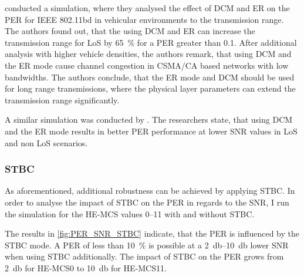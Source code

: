 \textcite{jacob_system-level_2020} conducted a simulation, where they analysed the effect of \ac{DCM} and \ac{ER} on the \ac{PER} for
IEEE 802.11bd in vehicular environments to the transmission range. The authors found out, that the using \ac{DCM} and \ac{ER} can
increase the transmission range for \ac{LoS} by \SI{65}{\percent} for a \ac{PER} greater than \num{0.1}. After additional analysis with higher
vehicle densities, the authors remark, that using \ac{DCM} and the \ac{ER} mode cause channel congestion in CSMA/CA based
networks with low bandwidths. The authors conclude, that the \ac{ER} mode and \ac{DCM} should be used for long range transmissions, where
the physical layer parameters can extend the transmission range significantly.

A similar simulation was conducted by \textcite{triwinarko_phy_2021}. The researchers state, that using \ac{DCM} and the
\ac{ER} mode results in better \ac{PER} performance at lower \ac{SNR} values in \ac{LoS} and non \ac{LoS} scenarios.

\subsubsection*{\acf{STBC}}
As aforementioned, additional robustness can be achieved by applying \ac{STBC}. In order to analyse the impact of \ac{STBC} on the \ac{PER} in regards to the \ac{SNR},
I run the simulation for the HE-MCS values \numrange{0}{11} with and without \ac{STBC}.

The results in \autoref{fig:PER_SNR_STBC} indicate, that the \ac{PER} is influenced
by the \ac{STBC} mode. A \ac{PER} of less than \SI{10}{\percent} is possible at a \SIrange{2}{10}{\decibel} lower \ac{SNR} when using \ac{STBC} additionally.
The impact of \ac{STBC} on the \ac{PER} grows from \SI{2}{\decibel} for HE-MCS\num{0} to \SI{10}{\decibel} for HE-MCS\num{11}.


